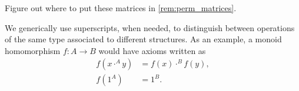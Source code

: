 \begin{rem}\label{rem:forward-matrices}
Figure out where to put these matrices in
\cref{rem:perm_matrices}.
\end{rem}

\begin{conv}[(Superscripts)]\label{conv:superscripts}
We generically use superscripts, when needed, to distinguish between operations of the same type associated to different structures. As an example, a monoid homomorphism $f \colon A \to B$ would have axioms written as
\begin{align*}
f(x \cdot^A y) & = f(x) \cdot^B f(y), \\
f(1^A) & = 1^B.
\end{align*}
\end{conv}


